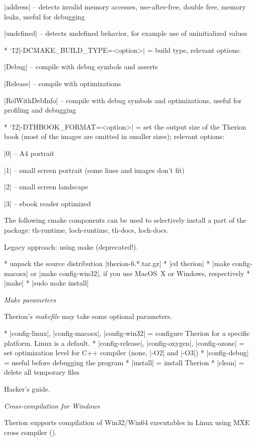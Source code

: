   |address| -- detects invalid memory accesses, use-after-free, double free, memory leaks, useful for debugging

  |undefined| -- detects undefined behavior, for example use of uninitialized values

* {\catcode`\=12|-DCMAKE_BUILD_TYPE=<option>|} = build type, relevant options:

  |Debug| -- compile with debug symbols and asserts

  |Release| -- compile with optimizations

  |RelWithDebInfo| -- compile with debug symbols and optimizations, useful for profiling and debugging

* {\catcode`\=12|-DTHBOOK_FORMAT=<option>|} = set the output size of the Therion book (most of the images are
  omitted in smaller sizes); relevant options:

  |0| -- A4 portrait

  |1| -- small screen portrait (some lines and images don't fit)

  |2| -- small screen landscape

  |3| -- ebook reader optimized

\endlist

The following cmake components can be used to selectively install a part of the package: th-runtime, loch-runtime,
th-docs, loch-docs.

\subsubchapter Legacy approach: using make (deprecated!).

\list
* unpack the source distribution |therion-6.*.tar.gz|
* |cd therion|
* |make config-macosx| or |make config-win32|, if you use MacOS~X or Windows,
  respectively
* |make|
* |sudo make install|
\endlist

{\it Make parameters}

Therion's {\it makefile} may take some optional parameters.

\list
* |config-linux|, |config-macosx|, |config-win32| = configure Therion for a
  specific platform. Linux is a default.
* |config-release|, |config-oxygen|, |config-ozone| = set optimization level
  for C++ compiler (none, |-O2| and |-O3|)
* |config-debug| = useful before debugging the program
* |install| = install Therion
* |clean| = delete all temporary files
\endlist

\subsubchapter Hacker's guide.

{\it Cross-compilation for Windows}

Therion supports compilation of Win32/Win64 executables in Linux using MXE cross
compiler ().

